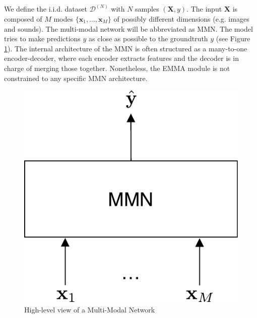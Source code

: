 We define the i.i.d. dataset $\mathcal{D}^{(N)}$ with $N$ samples  $(\mathbf{X},y)$. The input $\textbf{X}$ is composed of $M$ modes $\{\mathbf{x}_1, \ldots, \mathbf{x}_M\}$ of possibly different dimensions (e.g. images and sounds). The multi-modal network will be abbreviated as MMN. The model tries to make predictions $\hat{y}$ as close as possible to the groundtruth $y$ (see Figure \ref{fig:mnn}). The internal architecture of the MMN is often structured as a many-to-one encoder-decoder, where each encoder extracts features and the decoder is in charge of merging those together. Nonetheless, the EMMA module is not constrained to any specific MMN architecture.
\begin{figure}[!h]
\centering
\includegraphics[scale=0.5]{figures/mlp-without-emma}
\caption{High-level view of a Multi-Modal Network}	
\label{fig:mnn}
\end{figure}

